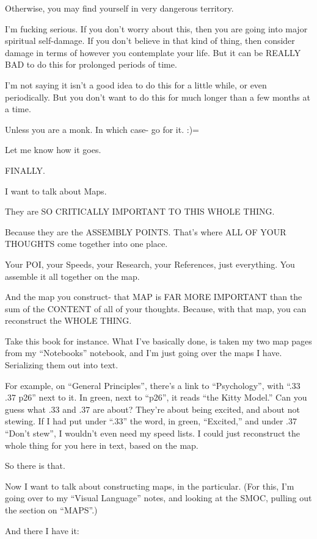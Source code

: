 \documentclass[oneside]{book}
\begin{document}
Otherwise, you may find yourself in very dangerous territory.

I'm fucking serious. If you don't worry about this, then you are going
into major spiritual self-damage. If you don't believe in that kind of
thing, then consider damage in terms of however you contemplate your
life. But it can be REALLY BAD to do this for prolonged periods of
time.

I'm not saying it isn't a good idea to do this for a little while, or
even periodically. But you don't want to do this for much longer than a
few months at a time.

Unless you are a monk. In which case- go for it. {:)}=

Let me know how it goes.

FINALLY.

I want to talk about Maps.

They are SO CRITICALLY IMPORTANT TO THIS WHOLE THING.

Because they are the ASSEMBLY POINTS. That's where ALL OF YOUR
THOUGHTS come together into one place.

Your POI, your Speeds, your Research, your References, just
everything. You assemble it all together on the map.

And the map you construct- that MAP is FAR MORE IMPORTANT than the sum
of the CONTENT of all of your thoughts. Because, with that map, you
can reconstruct the WHOLE THING.

Take this book for instance. What I've basically done, is taken my two
map pages from my ``Notebooks'' notebook, and I'm just going over the
maps I have. Serializing them out into text.

For example, on ``General Principles'', there's a link to ``Psychology'',
with ``.33  .37   p26'' next to it. In green, next to ``p26'', it reads
``the Kitty Model.'' Can you guess what .33 and .37 are about? They're
about being excited, and about not stewing. If I had put under ``.33''
the word, in green, ``Excited,'' and under .37 ``Don't stew'', I wouldn't
even need my speed lists. I could just reconstruct the whole thing for
you here in text, based on the map.

So there is that.

Now I want to talk about constructing maps, in the particular. (For
this, I'm going over to my ``Visual Language'' notes, and looking at the
SMOC, pulling out the section on ``MAPS''.)

And there I have it:
\end{document}
